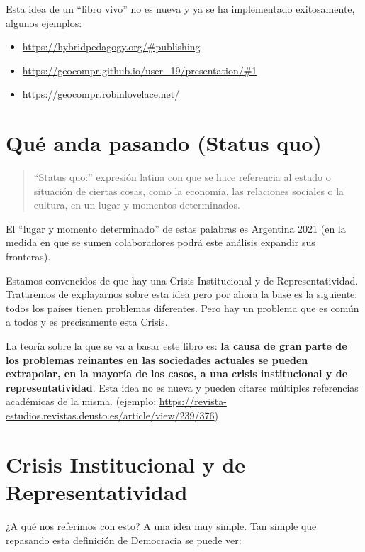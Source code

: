 \documentclass[
]{book}
\providecommand{\tightlist}{%
  \setlength{\itemsep}{0pt}\setlength{\parskip}{0pt}}
\begin{document}
Esta idea de un ``libro vivo'' no es nueva y ya se ha implementado exitosamente, algunos ejemplos:

\begin{itemize}
\tightlist
\item
  \url{https://hybridpedagogy.org/\#publishing}
\item
  \url{https://geocompr.github.io/user_19/presentation/\#1}
\item
  \url{https://geocompr.robinlovelace.net/}
\end{itemize}

\hypertarget{quuxe9-anda-pasando-status-quo}{%
\section{Qué anda pasando (Status quo)}\label{quuxe9-anda-pasando-status-quo}}

\begin{quote}
``Status quo:'' expresión latina con que se hace referencia al estado o situación de ciertas cosas, como la economía, las relaciones sociales o la cultura, en un lugar y momentos determinados.
\end{quote}

El ``lugar y momento determinado'' de estas palabras es Argentina 2021 (en la medida en que se sumen colaboradores podrá este análisis expandir sus fronteras).

Estamos convencidos de que hay una Crisis Institucional y de Representatividad. Trataremos de explayarnos sobre esta idea pero por ahora la base es la siguiente: todos los países tienen problemas diferentes. Pero hay un problema que es común a todos y es precisamente esta Crisis.

La teoría sobre la que se va a basar este libro es: \textbf{la causa de gran parte de los problemas reinantes en las sociedades actuales se pueden extrapolar, en la mayoría de los casos, a una crisis institucional y de representatividad}. Esta idea no es nueva y pueden citarse múltiples referencias académicas de la misma. (ejemplo: \url{https://revista-estudios.revistas.deusto.es/article/view/239/376})

\hypertarget{crisis-institucional-y-de-representatividad}{%
\section{Crisis Institucional y de Representatividad}\label{crisis-institucional-y-de-representatividad}}

¿A qué nos referimos con esto? A una idea muy simple. Tan simple que repasando esta definición de Democracia se puede ver:
\end{document}
